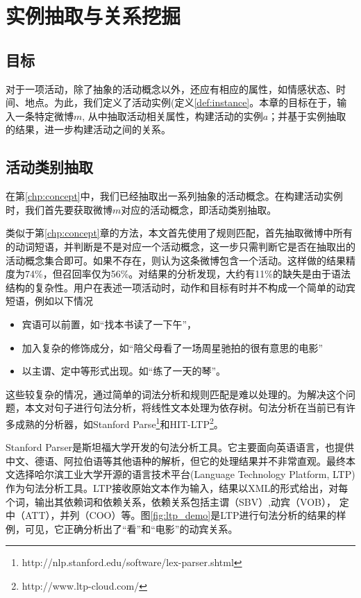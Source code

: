 \chapter{实例抽取与关系挖掘}
\section{目标}
对于一项活动，除了抽象的活动概念以外，还应有相应的属性，如情感状态、时间、地点。为此，我们定义了活动实例(定义\ref{def:instance}。本章的目标在于，输入一条特定微博$m$, 从中抽取活动相关属性，构建活动的实例$a$；并基于实例抽取的结果，进一步构建活动之间的关系。

\section{活动类别抽取}

在第\ref{chp:concept}中，我们已经抽取出一系列抽象的活动概念。在构建活动实例时，我们首先要获取微博$m$对应的活动概念，即活动类别抽取。

类似于第\ref{chp:concept}章的方法，本文首先使用了规则匹配，首先抽取微博中所有的动词短语，并判断是不是对应一个活动概念，这一步只需判断它是否在抽取出的活动概念集合即可。如果不存在，则认为这条微博包含一个活动。这样做的结果精度为74\%，但召回率仅为56\%。对结果的分析发现，大约有11\%的缺失是由于语法结构的复杂性。用户在表述一项活动时，动作和目标有时并不构成一个简单的动宾短语，例如以下情况
\begin{itemize}
\item 宾语可以前置，如``找本书读了一下午''，
\item 加入复杂的修饰成分，如``陪父母看了一场周星驰拍的很有意思的电影''
\item 以主谓、定中等形式出现。如``练了一天的琴''。
\end{itemize}
这些较复杂的情况，通过简单的词法分析和规则匹配是难以处理的。为解决这个问题，本文对句子进行句法分析，将线性文本处理为依存树。句法分析在当前已有许多成熟的分析器，如Stanford Parse\footnote{http://nlp.stanford.edu/software/lex-parser.shtml}和HIT-LTP\footnote{http://www.ltp-cloud.com/}。

Stanford Parser是斯坦福大学开发的句法分析工具。它主要面向英语语言，也提供中文、德语、阿拉伯语等其他语种的解析，但它的处理结果并不非常直观。最终本文选择哈尔滨工业大学开源的语言技术平台(Language Technology Platform, LTP)\cite{che2010ltp}作为句法分析工具。LTP接收原始文本作为输入，结果以XML的形式给出，对每个词，输出其依赖词和依赖关系，依赖关系包括主谓（SBV）,动宾（VOB）， 定中（ATT），并列（COO）等。图\ref{fig:ltp_demo}是LTP进行句法分析的结果的样例，可见，它正确分析出了``看''和``电影''的动宾关系。

